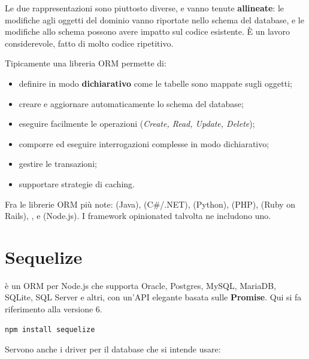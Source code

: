 Le due rappresentazioni sono piuttosto diverse, e vanno tenute
\textbf{allineate}: le modifiche agli oggetti del dominio vanno riportate nello
schema del database, e le modifiche allo schema possono avere impatto sul codice
esistente. È un lavoro considerevole, fatto di molto codice ripetitivo.


Tipicamente una libreria ORM permette di:

\begin{itemize}
  \item definire in modo \textbf{dichiarativo} come le tabelle sono mappate
        sugli oggetti;
  \item creare e aggiornare automaticamente lo schema del database;
  \item eseguire facilmente le operazioni  (\textit{Create, Read,
        Update, Delete});
  \item comporre ed eseguire interrogazioni complesse in modo dichiarativo;
  \item gestire le transazioni;
  \item supportare strategie di caching.
\end{itemize}

Fra le librerie ORM più note:  (Java), 
(C\#/.NET),  (Python),  (PHP),  (Ruby on Rails), ,  e 
(Node.js). I framework opinionated talvolta ne includono uno.

\section{Sequelize}

 è un ORM per Node.js che supporta Oracle, Postgres, MySQL,
MariaDB, SQLite, SQL Server e altri, con un'API elegante basata sulle
\textbf{Promise}. Qui si fa riferimento alla versione 6.

\begin{lstlisting}[style=shell]
npm install sequelize
\end{lstlisting}

Servono anche i driver per il database che si intende usare:

